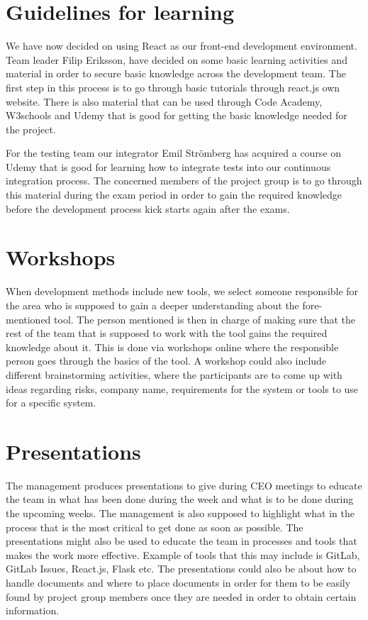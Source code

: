 \documentclass[12pt]{article}
\begin{document}
    
    
\clearpage

    \section{Guidelines for learning}
We have now decided on using React as our front-end development environment. Team leader Filip Eriksson, have decided on some basic learning activities and material in order to secure basic knowledge across the development team. The first step in this process is to go through basic tutorials through react.js own website. There is also material that can be used through Code Academy, W3schools and Udemy that is good for getting the basic knowledge needed for the project. 

For the testing team our integrator Emil Strömberg has acquired a course on Udemy that is good for learning how to integrate tests into our continuous integration process. The concerned members of the project group is to go through this material during the exam period in order to gain the required knowledge before the development process kick starts again after the exams. 

    \section{Workshops}
  When development methods include new tools, we select someone responsible for the area who is supposed to gain a deeper understanding about the fore-mentioned tool. The person mentioned is then in charge of making sure that the rest of the team that is supposed to work with the tool gains the required knowledge about it. This is done via workshops online where the responsible person goes through the basics of the tool.  A workshop could also include different brainstorming activities, where the participants are to come up with ideas regarding risks, company name, requirements for the system or tools to use for a specific system.
  
    \section{Presentations}
The management produces presentations to give during CEO meetings to educate the team in what has been done during the week and what is to be done during the upcoming weeks. The management is also supposed to highlight what in the process that is the most critical to get done as soon as possible. The presentations might also be used to educate the team in processes and tools that makes the work more effective. Example of tools that this may include is GitLab, GitLab Issues, React.js, Flask etc. The presentations could also be about how to handle documents and where to place documents in order for them to be easily found by project group members once they are needed in order to obtain certain information. 
\end{document}
